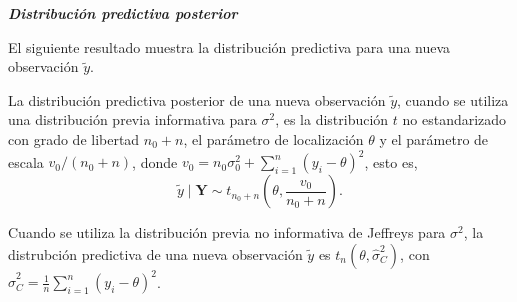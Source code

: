     \textbf{\emph{Distribuci\'on predictiva posterior}}
    
    El siguiente resultado muestra la distribuci\'on predictiva para una nueva observaci\'on $\tilde{y}$.
    \begin{Res}\label{pred_yy_sigma2}
    La distribuci\'on predictiva posterior de una nueva observaci\'on $\tilde{y}$, cuando se utiliza una distribuci\'on previa informativa para $\sigma^2$, es la distribuci\'on $t$ no estandarizado con grado de libertad $n_0+n$, el par\'ametro de localizaci\'on $\theta$ y el par\'ametro de escala $v_0/(n_0+n)$, donde $v_0=n_0\sigma^2_0+\sum_{i=1}^n(y_i-\theta)^2$, esto es, 
    \begin{equation*}
    \tilde{y} \mid \mathbf{Y}\sim t_{n_0+n}\left(\theta,\frac{v_0}{n_0+n}\right).
    \end{equation*} 
    
    Cuando se utiliza la distribuci\'on previa no informativa de Jeffreys para $\sigma^2$, la distrubci\'on predictiva de una nueva observaci\'on $\tilde{y}$ es $t_n(\theta,\hat{\sigma}^2_C)$, con $\hat{\sigma}^2_C=\frac{1}{n}\sum_{i=1}^n(y_i-\theta)^2$. 
    \end{Res}
    
